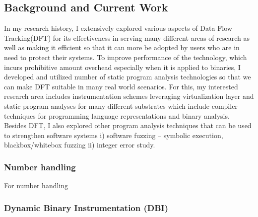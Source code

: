 \documentclass[letterpaper, 10pt]{article}
\begin{document}
\begin{small}
\subsection*{Background and Current Work}
%
In my research history, I extensively explored various aspects of Data Flow
Tracking(DFT) for its effectiveness in serving many different areas of research
as well as making it efficient so that it can more be adopted by users who are in
need to protect their systems.
%
To improve  performance of the technology, which incurs prohibitive amount
overhead especially when it is applied to binaries, I developed and utilized
number of static program analysis technologies so that we can make DFT suitable
in many real world scenarios.
%
For this, my interested research area includes instrumentation schemes
leveraging virtualization layer and static program analyses for many different
substrates which include compiler techniques for programming language
representations and binary analysis.
%
Besides DFT, I also explored other program analysis techniques that can be used
to strengthen software systems i) software fuzzing -- symbolic execution,
blackbox/whitebox fuzzing ii) integer error study.


\subsubsection*{Number handling}
For number handling 

\subsubsection*{Dynamic Binary Instrumentation (DBI)}

\subsubsection*{}


\end{small}
\end{document}

